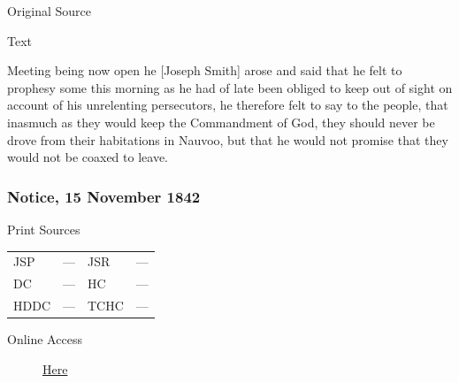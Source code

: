 				\begin{description}
					\item[Original Source]
				\end{description}
				
				
				\begin{description}
					\item[Text]
				\end{description}
				
					Meeting being now open he [Joseph Smith] arose and said that he felt to prophesy some this morning as he had of late been obliged to keep out of sight on account of his unrelenting persecutors, he therefore felt to say to the people, that inasmuch as they would keep the Commandment of God, they should never be drove from their habitations in Nauvoo, but that he would not promise that they would not be coaxed to leave.
					
		\subsubsection{Notice, 15 November 1842}
			\label{EMS-1842-JS-15-NOV-1842}
		
			\begin{description}
				\item[Print Sources]
			\end{description}

			\begin{tabular}{p{0.5in}p{1in}p{0.5in}p{1in}}
				JSP	 	& ---		& JSR 		& --- \\
				DC	 	& ---		& HC 		& --- \\
				HDDC 	& ---		& TCHC 		& --- \\
			\end{tabular}
			
			\begin{description}
				\item[Online Access] \href{https://www.josephsmithpapers.org/paper-summary/notice-15-november-1842/1}{Here}
			\end{description}
			
